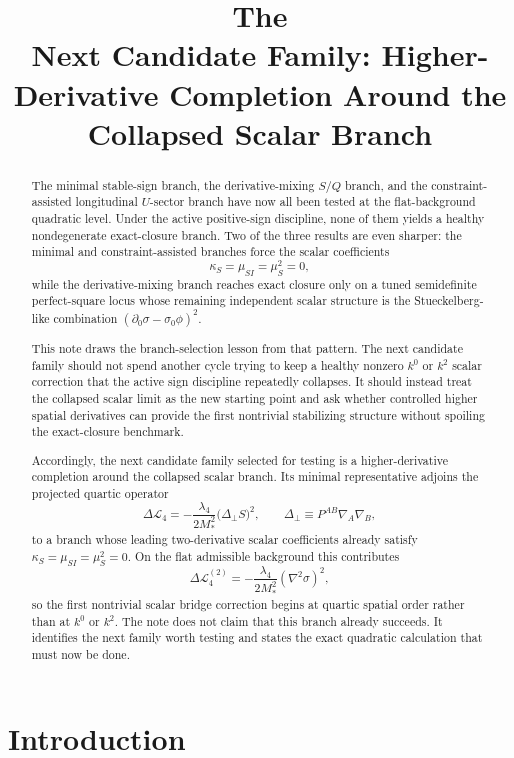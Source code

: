 \documentclass[11pt]{article}
\title{\textbf{The \TheoryName{}}\\[0.4em]
\large Next Candidate Family: Higher-Derivative Completion Around the Collapsed Scalar Branch}
\author{}
\date{}
\begin{document}
\maketitle

\begin{abstract}
The minimal stable-sign branch, the derivative-mixing \(S/Q\) branch, and the constraint-assisted longitudinal \(U\)-sector branch have now all been tested at the flat-background quadratic level. Under the active positive-sign discipline, none of them yields a healthy nondegenerate exact-closure branch. Two of the three results are even sharper: the minimal and constraint-assisted branches force the scalar coefficients
\[
\kappa_S=\mu_{SI}=\mu_S^2=0,
\]
while the derivative-mixing branch reaches exact closure only on a tuned semidefinite perfect-square locus whose remaining independent scalar structure is the Stueckelberg-like combination \((\partial_0\sigma-\sigma_0\phi)^2\).

This note draws the branch-selection lesson from that pattern. The next candidate family should not spend another cycle trying to keep a healthy nonzero \(k^0\) or \(k^2\) scalar correction that the active sign discipline repeatedly collapses. It should instead treat the collapsed scalar limit as the new starting point and ask whether controlled higher spatial derivatives can provide the first nontrivial stabilizing structure without spoiling the exact-closure benchmark.

Accordingly, the next candidate family selected for testing is a higher-derivative completion around the collapsed scalar branch. Its minimal representative adjoins the projected quartic operator
\[
\Delta\mathcal L_{4}
=
-\frac{\lambda_4}{2M_*^2}\bigl(\Delta_{\perp}S\bigr)^2,
\qquad
\Delta_{\perp}\equiv P^{AB}\nabla_A\nabla_B,
\]
to a branch whose leading two-derivative scalar coefficients already satisfy \(\kappa_S=\mu_{SI}=\mu_S^2=0\). On the flat admissible background this contributes
\[
\Delta\mathcal L_{4}^{(2)}
=
-\frac{\lambda_4}{2M_*^2}(\nabla^2\sigma)^2,
\]
so the first nontrivial scalar bridge correction begins at quartic spatial order rather than at \(k^0\) or \(k^2\). The note does not claim that this branch already succeeds. It identifies the next family worth testing and states the exact quadratic calculation that must now be done.
\end{abstract}

\section{Introduction}
\end{document}
